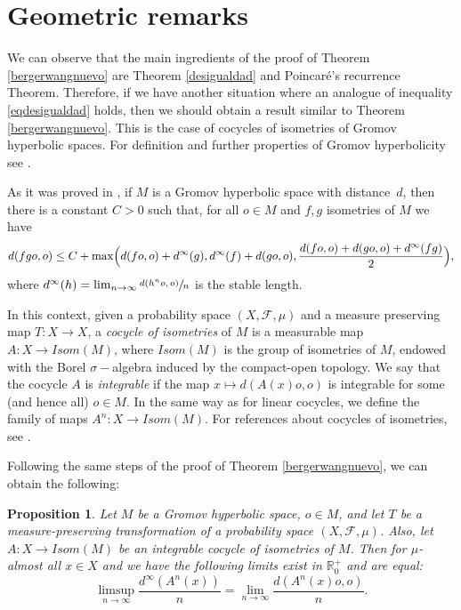 \documentclass[JEP,XML,SOM,Unicode,NoEqCountersInSection]{cedram}
\let\mathcal\mathscr
\theoremstyle{plain}
\newtheorem{prop}[teo]{Proposition}
\theoremstyle{definition}
\newcommand{\RR}{\mathbb{R}}
\newcommand{\Isom}{\mathit{Isom}}
\newcommand{\ccl}[3]{#1^{#2}(#3)}
\begin{document}
\section{Geometric remarks}\label{seccionseis}

We can observe that the main ingredients of the proof of Theorem \ref{bergerwangnuevo} are Theorem \ref{desigualdad} and Poincaré's recurrence Theorem. Therefore, if we have another situation where an analogue of inequality \eqref{eqdesigualdad} holds, then we should obtain a result similar to Theorem \ref{bergerwangnuevo}. This is the case of cocycles of isometries of Gromov hyperbolic spaces. For definition and further properties of Gromov hyperbolicity see \cite{bri,papa,geodyn}.

As it was proved in \cite[Th.\,1.2]{yo}, if $M$ is a Gromov hyperbolic space with distance~$d$, then there is a constant $C>0$ such that, for all $o\in M$ and $f,g$ isometries of $M$ we have
\begin{equation*}
d(fgo,o)\leq C+\max \Bigl(d(fo,o)+d^{\infty}(g),d^{\infty}(f)+d(go,o),\frac{d(fo,o)+d(go,o)+d^{\infty}(fg)}{2}\Bigr),
\end{equation*}
where $d^{\infty}(h)=\lim_{n\to \infty}\sfrac{d(h^{n}o,o)}{n}$ is the stable length.

In this context, given a probability space $(X,\mathcal{F},\mu)$ and a measure preserving map $T:X\rightarrow X$, a \textit{cocycle of isometries} of $M$ is a measurable map $A:X\rightarrow \Isom(M)$, where $\Isom(M)$ is the group of isometries of $M$, endowed with the Borel $\sigma-$algebra induced by the compact-open topology. We say that the cocycle $A$ is \textit{integrable} if the map $x\mapsto d(A(x)o,o)$ is integrable for some (and hence all) $o \in M$. In the same way as for linear cocycles, we define the family of maps $A^{n}:X\rightarrow \Isom(M)$. For references about cocycles of isometries, see \eg \cite{goukar,karmar}.

Following the same steps of the proof of Theorem \ref{bergerwangnuevo}, we can obtain the following:

\begin{prop}\label{bewagromov}Let $M$ be a Gromov hyperbolic space, $o\in M$, and let $T$ be a measure-preserving transformation of a probability space $(X,\mathcal{F},\mu)$. Also, let $A: X \rightarrow \Isom(M)$ be an integrable cocycle of isometries of $M$. Then for $\mu$-almost all $x\in X$ and we have the following limits exist in $\RR^{+}_{0}$ and are equal:\vspace*{-3pt}\enlargethispage{\baselineskip}%
\begin{equation*}
\limsup_{n\to \infty}{\frac{d^{\infty}(\ccl{A}{n}{x})}{n}}=\lim_{n \to \infty}{\frac{d(\ccl{A}{n}{x}o,o)}{n}}.
\end{equation*}
\end{prop}
\end{document}
